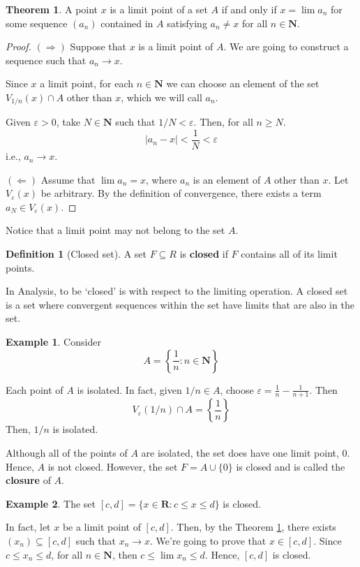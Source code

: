 \documentclass[tikz,12pt,a4paper]{article}
\theoremstyle{definition}
\newtheorem{theorem}{Theorem}[section]
\newtheorem{example}{Example}[section]
\newtheorem{definition}{Definition}[section]
\begin{document}
\begin{theorem}\label{limpointseq}
	A point $x$ is a limit point of a set $A$ if and only if $x = \lim a_n$ for some sequence $(a_n)$ contained in $A$ satisfying $a_n \neq x$ for all $n \in \textbf{N}$.
\end{theorem}

\begin{proof}
	$(\Rightarrow)$ Suppose that $x$ is a limit point of $A$. We are going to construct a sequence such that $a_n \longrightarrow x$.
	
	Since $x$ a limit point, for each $n \in \textbf{N}$ we can choose an element of the set $V_{1/n}(x) \cap A$ other than $x$, which we will call $a_n$.
	
	Given $\varepsilon > 0$, take $N \in \textbf{N}$ such that $1/N < \varepsilon$. Then, for all $n \geq N$.
	\[
		| a_n - x | < \frac{1}{N} < \varepsilon
	\]
	i.e., $a_n \longrightarrow x$.
	
	$(\Leftarrow)$ Assume that $\lim a_n = x$, where $a_n$ is an element of $A$ other than $x$. Let $V_\varepsilon(x)$ be arbitrary. By the definition of convergence, there exists a term $a_N \in V_\varepsilon(x)$.
\end{proof}

Notice that a limit point may not belong to the set $A$.

\begin{definition}[Closed set]
	A set $F \subseteq{R}$ is \textbf{closed} if $F$ contains all of its limit points.
\end{definition}

In Analysis, to be `closed' is with respect to the limiting operation. A closed set is a set where convergent sequences within the set have limits that are also in the set.

\begin{example}
	Consider
	\[
		A = \left\{ \frac{1}{n} : n \in \textbf{N} \right\}
	\]
	
	Each point of $A$ is isolated. In fact, given $1/n \in A$, choose $\varepsilon = \frac{1}{n} - \frac{1}{n+1}$. Then \[ V_\varepsilon(1/n) \cap A = \left\{ \frac{1}{n} \right\} \] Then, $1/n$ is isolated. 
	
	Although all of the points of $A$ are isolated, the set does have one limit point, $0$. Hence, $A$ is not closed. However, the set $F = A \cup \{0\}$ is closed and is called the \textbf{closure} of $A$. 
\end{example}

\begin{example}
	The set $[c,d] = \{ x \in \textbf{R} : c \leq x \leq d \}$ is closed.
	
	In fact, let $x$ be a limit point of $[c,d]$. Then, by the Theorem \ref{limpointseq}, there exists $(x_n) \subseteq [c,d]$ such that $x_n \to x$. We're going to prove that $x \in [c,d]$. Since $c \leq x_n \leq d$, for all $n \in \textbf{N}$, then $c \leq \lim x_n \leq d$. Hence, $[c,d]$ is closed.
\end{example}
\end{document}
